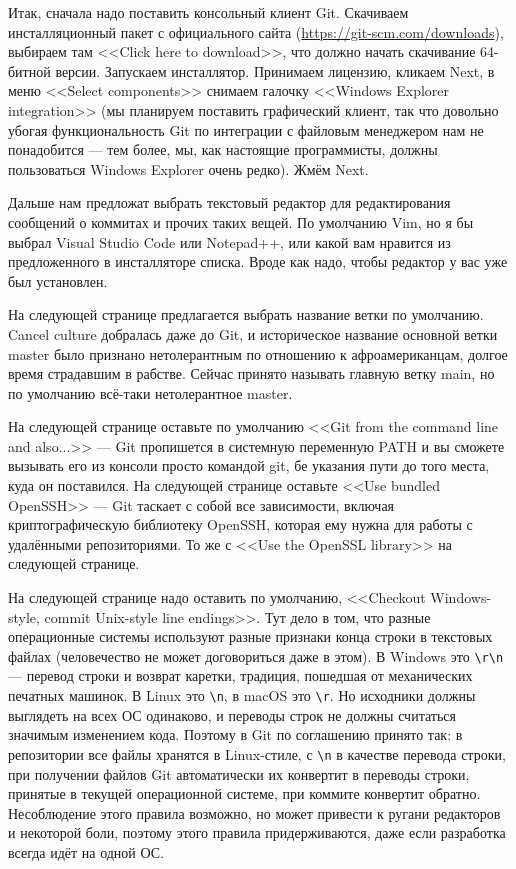 \documentclass{../../text-style}
\begin{document}
Итак, сначала надо поставить консольный клиент Git. Скачиваем инсталляционный пакет с официального сайта (\url{https://git-scm.com/downloads}), выбираем там <<Click here to download>>, что должно начать скачивание 64-битной версии. Запускаем инсталлятор. Принимаем лицензию, кликаем Next, в меню <<Select components>> снимаем галочку <<Windows Explorer integration>> (мы планируем поставить графический клиент, так что довольно убогая функциональность Git по интеграции с файловым менеджером нам не понадобится --- тем более, мы, как настоящие программисты, должны пользоваться Windows Explorer очень редко). Жмём Next.

Дальше нам предложат выбрать текстовый редактор для редактирования сообщений о коммитах и прочих таких вещей. По умолчанию Vim, но я бы выбрал Visual Studio Code или Notepad++, или какой вам нравится из предложенного в инсталляторе списка. Вроде как надо, чтобы редактор у вас уже был установлен.

На следующей странице предлагается выбрать название ветки по умолчанию. Cancel culture добралась даже до Git, и историческое название основной ветки master было признано нетолерантным по отношению к афроамериканцам, долгое время страдавшим в рабстве. Сейчас принято называть главную ветку main, но по умолчанию всё-таки нетолерантное master.

На следующей странице оставьте по умолчанию <<Git from the command line and also...>> --- Git пропишется в системную переменную PATH и вы сможете вызывать его из консоли просто командой git, бе указания пути до того места, куда он поставился. На следующей странице оставьте <<Use bundled OpenSSH>> --- Git таскает с собой все зависимости, включая криптографическую библиотеку OpenSSH, которая ему нужна для работы с удалёнными репозиториями. То же с <<Use the OpenSSL library>> на следующей странице.

На следующей странице надо оставить по умолчанию, <<Checkout Windows-style, commit Unix-style line endings>>. Тут дело в том, что разные операционные системы используют разные признаки конца строки в текстовых файлах (человечество не может договориться даже в этом). В Windows это \verb|\r\n| --- перевод строки и возврат каретки, традиция, пошедшая от механических печатных машинок. В Linux это \verb|\n|, в macOS это \verb|\r|. Но исходники должны выглядеть на всех ОС одинаково, и переводы строк не должны считаться значимым изменением кода. Поэтому в Git по соглашению принято так: в репозитории все файлы хранятся в Linux-стиле, с \verb|\n| в качестве перевода строки, при получении файлов Git автоматически их конвертит в переводы строки, принятые в текущей операционной системе, при коммите конвертит обратно. Несоблюдение этого правила возможно, но может привести к ругани редакторов и некоторой боли, поэтому этого правила придерживаются, даже если разработка всегда идёт на одной ОС.
\end{document}
